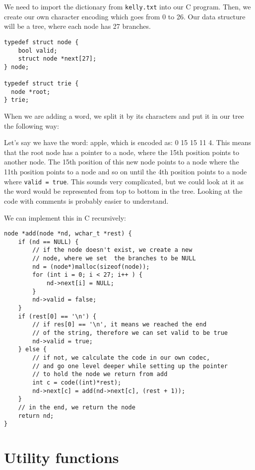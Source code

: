 \documentclass[a4paper,11pt]{article}
\begin{document}
    We need to import the dictionary from {\tt kelly.txt} into our C program.
    Then, we create our own character encoding which goes from 0 to 26.
    Our data structure will be a tree, where each node has 27 branches.

    \begin{verbatim}
typedef struct node {
    bool valid;
    struct node *next[27];
} node;

typedef struct trie {
  node *root;
} trie;
    \end{verbatim}

    When we are adding a word, we split it by its characters and put it in our tree the following way:
    
    Let's say we have the word: apple, which is encoded as: 0 15 15 11 4. 
    This means that the root node has a pointer to a node, where the 15th position points to another node.
    The 15th position of this new node points to a node where the 11th position points to a node and so on until the 4th position points to a node where {\tt valid = true}.
    This sounds very complicated, but we could look at it as the word would be represented from top to bottom in the tree.
    Looking at the code with comments is probably easier to understand.

    We can implement this in C recursively:

    \begin{verbatim}
node *add(node *nd, wchar_t *rest) {
    if (nd == NULL) {
        // if the node doesn't exist, we create a new
        // node, where we set  the branches to be NULL
        nd = (node*)malloc(sizeof(node));
        for (int i = 0; i < 27; i++ ) {
            nd->next[i] = NULL;
        }
        nd->valid = false;
    }
    if (rest[0] == '\n') {
        // if res[0] == '\n', it means we reached the end
        // of the string, therefore we can set valid to be true
        nd->valid = true;
    } else {
        // if not, we calculate the code in our own codec,
        // and go one level deeper while setting up the pointer
        // to hold the node we return from add
        int c = code((int)*rest);
        nd->next[c] = add(nd->next[c], (rest + 1));
    } 
    // in the end, we return the node
    return nd;
}
    \end{verbatim}

    \section*{Utility functions}
\end{document}
